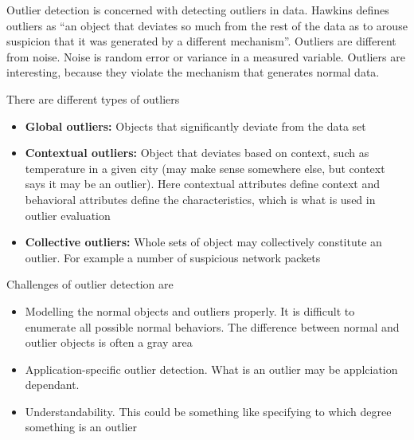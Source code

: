 Outlier detection is concerned with detecting outliers in data. Hawkins defines outliers as ``an object that deviates so much from the rest of the data as to arouse suspicion that it was generated by a different mechanism''. Outliers are different from noise. Noise is random error or variance in a measured variable. Outliers are interesting, because they violate the mechanism that generates normal data.

There are different types of outliers
\begin{itemize}
    \item \textbf{Global outliers:} Objects that significantly deviate from the data set
    \item \textbf{Contextual outliers:} Object that deviates based on context, such as temperature in a given city (may make sense somewhere else, but context says it may be an outlier). Here contextual attributes define context and behavioral attributes define the characteristics, which is what is used in outlier evaluation
    \item \textbf{Collective outliers:} Whole sets of object may collectively constitute an outlier. For example a number of suspicious network packets
\end{itemize}

Challenges of outlier detection are 

\begin{itemize}
    \item Modelling the normal objects and outliers properly. It is difficult to enumerate all possible normal behaviors. The difference between normal and outlier objects is often a gray area
    \item Application-specific outlier detection. What is an outlier may be applciation dependant.
    \item Understandability. This could be something like specifying to which degree something is an outlier
\end{itemize}

